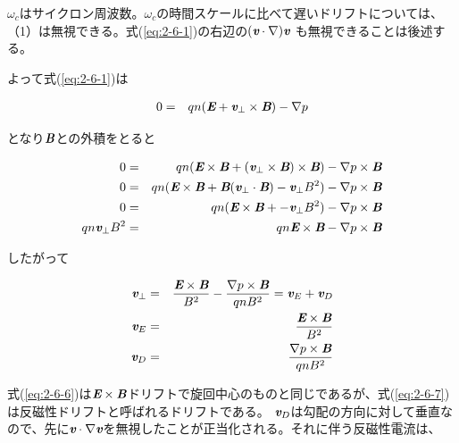\documentclass[a4paper,11pt,titlepage]{jarticle}
\numberwithin{equation}{section} %
\begin{document}
$\omega _c$はサイクロン周波数。$\omega _c$の時間スケールに比べて遅いドリフトについては、（1）は無視できる。式(\ref*{eq:2-6-1})の右辺の$(\textit{\textbf{v}}  \cdot \nabla ) \textit{\textbf{v}} $ も無視できることは後述する。

よって式(\ref*{eq:2-6-1})は

\begin{eqnarray}
  0&=&qn (\textit{\textbf{E}} + \textit{\textbf{v}}_\perp \times \textit{\textbf{B}}) - \nabla p 
\end{eqnarray}

となり$\textit{\textbf{B}}$との外積をとると

\begin{eqnarray}
  0&=&qn (\textit{\textbf{E}} \times \textit{\textbf{B}} + (\textit{\textbf{v}}_\perp \times \textit{\textbf{B}}) \times \textit{\textbf{B}}) - \nabla p \times \textit{\textbf{B}} \nonumber \\
  0&=&qn (\textit{\textbf{E}} \times \textit{\textbf{B}} + \textit{\textbf{B}}(\textit{\textbf{v}}_\perp  \cdot \textit{\textbf{B}}) - \textit{\textbf{v}}_\perp B^2) - \nabla p \times \textit{\textbf{B}} \nonumber \\
  0&=&qn (\textit{\textbf{E}} \times \textit{\textbf{B}} +  - \textit{\textbf{v}}_\perp B^2) - \nabla p \times \textit{\textbf{B}} \nonumber \\
  qn \textit{\textbf{v}}_\perp B^2 &=& qn\textit{\textbf{E}} \times \textit{\textbf{B}} - \nabla p \times \textit{\textbf{B}}
\end{eqnarray}

したがって

\begin{eqnarray}
  \textit{\textbf{v}}_\perp &=& \frac{\textit{\textbf{E}} \times \textit{\textbf{B}}}{B^2} - \frac{\nabla p \times \textit{\textbf{B}}}{qn B^2} = \textit{\textbf{v}}_E + \textit{\textbf{v}}_D \\
  \label{eq:2-6-6}
  \textit{\textbf{v}}_E &=& \frac{\textit{\textbf{E}} \times \textit{\textbf{B}}}{B^2}\\
  \label{eq:2-6-7}
  \textit{\textbf{v}}_D &=& \frac{\nabla p \times \textit{\textbf{B}}}{qn B^2}
\end{eqnarray}

式(\ref{eq:2-6-6})は$\textit{\textbf{E}} \times \textit{\textbf{B}} $ドリフトで旋回中心のものと同じであるが、式(\ref{eq:2-6-7})は反磁性ドリフトと呼ばれるドリフトである。
$\textit{\textbf{v}}_D$は勾配の方向に対して垂直なので、先に$\textit{\textbf{v}}  \cdot \nabla \textit{\textbf{v}}$を無視したことが正当化される。それに伴う反磁性電流は、
\end{document}
